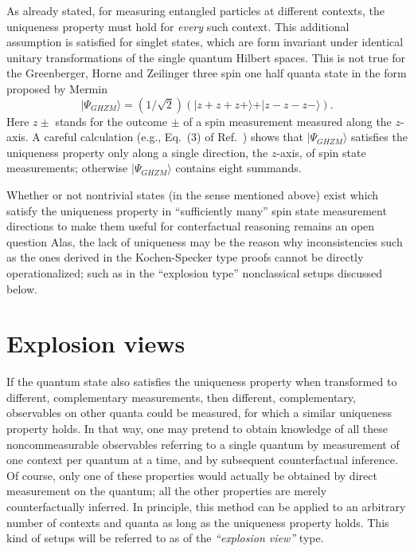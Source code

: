 \documentclass{aipproc}
\begin{document}
As already stated, for measuring entangled particles at different contexts, the uniqueness property
must hold for {\em every} such context.
This additional assumption is satisfied for singlet states,
which are form invariant under identical unitary transformations of the single quantum Hilbert spaces.
This is not true for the Greenberger, Horne and Zeilinger three spin one half quanta state
in the form proposed by Mermin \cite{mermin1}
$$
\vert \Psi_{GHZM} \rangle
= ({1/ \sqrt{2}})(
\vert z+ z+ z+\rangle
+
\vert z- z- z-\rangle
).$$
Here $z\pm$ stands for the outcome $\pm$ of a spin measurement  measured along the $z$-axis.
A careful calculation (e.g., Eq.~(3) of Ref.~\cite{krenn1}) shows that
$\vert \Psi_{GHZM}\rangle $
satisfies the uniqueness property only along a single direction, the $z$-axis, of spin state measurements;
otherwise $\vert \Psi_{GHZM}\rangle $ contains eight summands.

Whether or not nontrivial states (in the sense mentioned above) exist which
satisfy the uniqueness property in ``sufficiently many'' spin state measurement directions
to make them useful for conterfactual reasoning
remains an open question
Alas, the lack of uniqueness  may be the reason why inconsistencies such as the ones derived in the
Kochen-Specker type proofs cannot be directly operationalized;
such as in the ``explosion type'' nonclassical setups discussed below.



\section{Explosion views}

If the quantum state also satisfies the uniqueness property when transformed to different,
complementary measurements, then
different,  complementary, observables on other quanta could be measured, for which a similar
uniqueness property holds.
In that way, one may pretend to obtain knowledge of
all these noncommeasurable observables referring to a single quantum
by measurement of one context per quantum at a time, and by subsequent counterfactual inference.
Of course, only one of these properties would actually be obtained by direct measurement on the
quantum; all the other properties are merely counterfactually inferred.
In principle, this method can be applied to an arbitrary number of contexts and quanta
as long as the uniqueness property holds.
This kind of setups will be referred to as of the {\em ``explosion view''} type.
\end{document}
